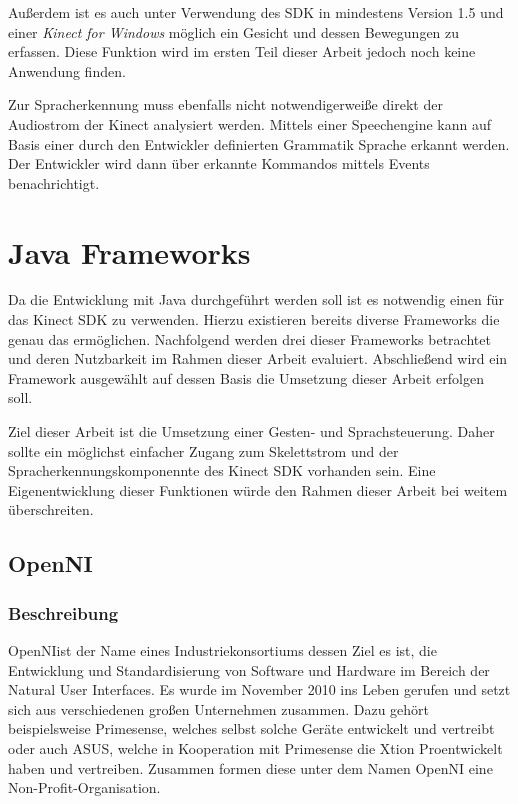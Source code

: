 \newpage
Au\ss erdem ist es auch unter Verwendung des SDK in mindestens Version 1.5 und einer \textit{Kinect for Windows} m\"oglich 
ein Gesicht und dessen Bewegungen zu erfassen\footnotemark[5]. Diese Funktion wird im ersten Teil dieser Arbeit jedoch noch keine Anwendung finden.
\par\smallskip 
Zur Spracherkennung muss ebenfalls nicht notwendigerwei\ss e direkt der Audiostrom der Kinect analysiert werden. Mittels einer Speechengine kann auf Basis 
einer durch den Entwickler definierten Grammatik Sprache erkannt werden. Der Entwickler wird dann \"uber erkannte Kommandos mittels Events benachrichtigt. 

\section{Java Frameworks}

Da die Entwicklung mit Java durchgef\"uhrt werden soll ist es notwendig einen  f\"ur das Kinect SDK zu verwenden.
Hierzu existieren bereits diverse Frameworks die genau das erm\"oglichen.
Nachfolgend werden drei dieser Frameworks betrachtet und deren Nutzbarkeit im Rahmen dieser Arbeit evaluiert.
Abschlie\ss end wird ein Framework ausgew\"ahlt auf dessen Basis die Umsetzung dieser Arbeit erfolgen soll.
\par\smallskip 
Ziel dieser Arbeit ist die Umsetzung einer Gesten- und Sprachsteuerung. Daher sollte ein m\"oglichst einfacher Zugang zum Skelettstrom und der 
Spracherkennungskomponennte des Kinect SDK vorhanden sein. Eine Eigenentwicklung dieser Funktionen w\"urde den Rahmen dieser Arbeit bei weitem \"uberschreiten.


\subsection{OpenNI}

\subsubsection{Beschreibung}
OpenNI\footnotemark[7] ist der Name eines Industriekonsortiums dessen Ziel es ist, die Entwicklung und Standardisierung von Software und Hardware 
im Bereich der Natural User Interfaces.
Es wurde im November 2010 ins Leben gerufen und setzt sich aus verschiedenen großen Unternehmen zusammen. Dazu geh\"ort beispielsweise Primesense, 
welches selbst solche Ger\"ate entwickelt und vertreibt oder auch ASUS, welche in Kooperation mit Primesense die Xtion Pro\footnotemark[9] entwickelt haben und vertreiben.
Zusammen formen diese unter dem Namen OpenNI eine Non-Profit-Organisation.

